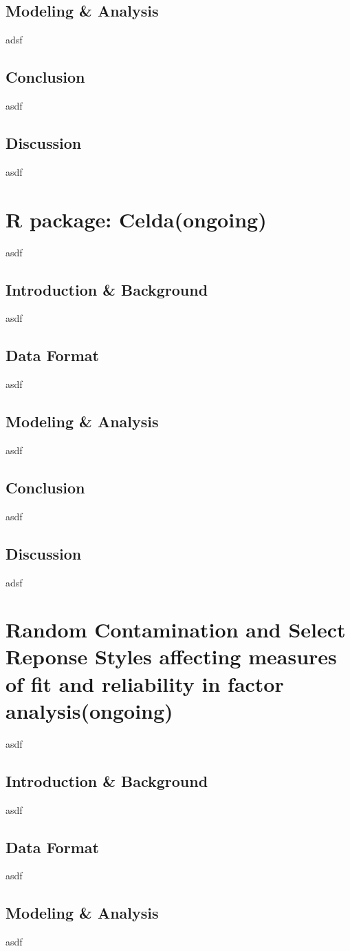 \documentclass{article}
\begin{document}
	\subsection{Modeling \& Analysis}
	adsf
	\subsection{Conclusion}
	asdf
	\subsection{Discussion}
	asdf

	\section{R package: Celda(ongoing)}
	asdf
	\subsection{Introduction \& Background}
	asdf
	\subsection{Data Format}
	asdf
	\subsection{Modeling \& Analysis}
	asdf
	\subsection{Conclusion}
	asdf
	\subsection{Discussion}
	adsf
	
	\section{Random Contamination and Select Reponse Styles affecting measures of fit and reliability in factor analysis(ongoing)}
	asdf
	\subsection{Introduction \& Background}
	asdf
	\subsection{Data Format}
	asdf
	\subsection{Modeling \& Analysis}
	asdf
\end{document}
